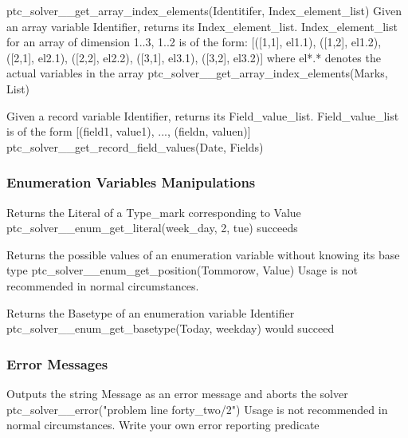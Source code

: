\documentclass{article}
\begin{document}
\hspace{\parindent}\pro
{ptc\_solver\_\_get\_array\_index\_elements(Identitifer, Index\_element\_list)}
    {Given an array variable Identifier, returns its Index\_element\_list.
Index\_element\_list for an array of dimension 1..3, 1..2 is of the form:
 [([1,1], el1.1), ([1,2], el1.2), ([2,1], el2.1), ([2,2], el2.2), ([3,1], el3.1),
([3,2],
 el3.2)] where el*.* denotes the actual variables in the array}
        {ptc\_solver\_\_get\_array\_index\_elements(Marks, List)}
        {}

    {Given a record variable Identifier, returns its Field\_value\_list.
Field\_value\_list is of the form [(field1, value1), ..., (fieldn, valuen)]}
        {ptc\_solver\_\_get\_record\_field\_values(Date, Fields)}
        {}

\subsubsection{Enumeration Variables Manipulations}

\hspace{\parindent}
        {Returns the Literal of a Type\_mark corresponding to Value}
        {ptc\_solver\_\_enum\_get\_literal(week\_day, 2, tue) succeeds}
        {}

        {Returns the possible values of an enumeration variable without knowing
its base type}
        {ptc\_solver\_\_enum\_get\_position(Tommorow, Value)}
        {Usage is not recommended in normal circumstances.}


        {Returns the Basetype of an enumeration variable Identifier}
        {ptc\_solver\_\_enum\_get\_basetype(Today, weekday) would succeed}
        {}

\subsubsection{Error Messages}

\hspace{\parindent}
        {Outputs the string Message as an error message and aborts the solver}
        {ptc\_solver\_\_error("problem line forty\_two/2")}
        {Usage is not recommended in normal circumstances. Write your own error
reporting predicate}

%
%

\end{document}
